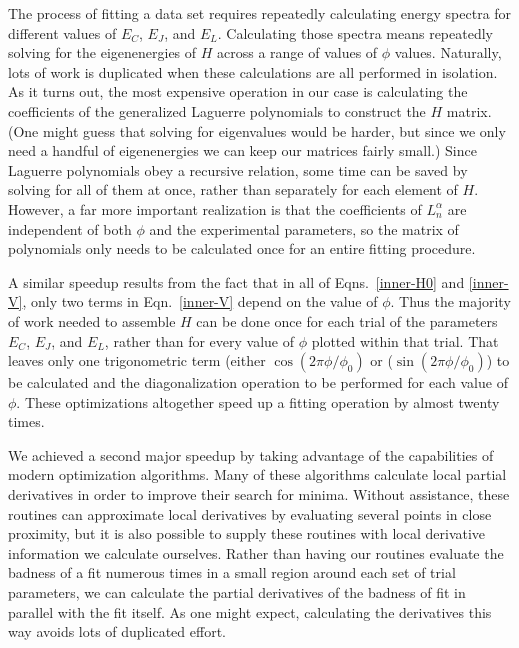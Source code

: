 \documentclass[twocolumn]{revtex4}
\begin{document}
The process of fitting a data set requires repeatedly calculating
energy spectra for different values of $E_C$, $E_J$, and
$E_L$. Calculating those spectra means repeatedly solving for the
eigenenergies of $H$ across a range of values of $\phi$
values. Naturally, lots of work is duplicated when these calculations
are all performed in isolation. As it turns out, the most expensive
operation in our case is calculating the coefficients of the
generalized Laguerre polynomials to construct the $H$ matrix. (One
might guess that solving for eigenvalues would be harder, but since we
only need a handful of eigenenergies we can keep our matrices fairly
small.) Since Laguerre polynomials obey a recursive relation, some
time can be saved by solving for all of them at once, rather than
separately for each element of $H$. However, a far more important
realization is that the coefficients of $L_n^\alpha$ are independent
of both $\phi$ and the experimental parameters, so the matrix of
polynomials only needs to be calculated once for an entire fitting
procedure.

A similar speedup results from the fact that in all of
Eqns.~\ref{inner-H0} and \ref{inner-V}, only two terms in
Eqn.~\eqref{inner-V} depend on the value of $\phi$. Thus the majority of
work needed to assemble $H$ can be done once for each trial of the
parameters $E_C$, $E_J$, and $E_L$, rather than for every value of
$\phi$ plotted within that trial. That leaves only one trigonometric
term (either $\cos\left(2\pi\phi/\phi_0\right)$ or
($\sin\left(2\pi\phi/\phi_0\right)$) to be calculated and the
diagonalization operation to be performed for each value of
$\phi$. These optimizations altogether speed up a fitting operation by
almost twenty times.

We achieved a second major speedup by taking advantage of the
capabilities of modern optimization algorithms\cite{Byrd}\cite{Zhu}.
Many of these algorithms calculate local partial derivatives in order
to improve their search for minima. Without assistance, these routines
can approximate local derivatives by evaluating several points in
close proximity, but it is also possible to supply these routines with
local derivative information we calculate ourselves. Rather than
having our routines evaluate the badness of a fit numerous times in a
small region around each set of trial parameters, we can calculate the
partial derivatives of the badness of fit in parallel with the fit
itself. As one might expect, calculating the derivatives this way
avoids lots of duplicated effort.
\end{document}

